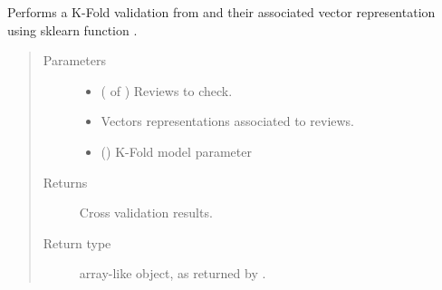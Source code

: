 \documentclass[letterpaper,10pt,english]{sphinxmanual}
\begin{document}
\begin{fulllineitems}
\label{\detokenize{learning:loacore.learning.validation.k_fold_validation}}
Performs a K-Fold validation from  and their associated vector representation using sklearn function
.
\begin{quote}\begin{description}
\item[{Parameters}] \leavevmode\begin{itemize}
\item {} 
 ( of {\hyperref[\detokenize{classes:loacore.classes.classes.Review}]{}}) \textendash{} Reviews to check.

\item {} 
 \textendash{} Vectors representations associated to reviews.

\item {} 
 () \textendash{} K-Fold model parameter

\end{itemize}

\item[{Returns}] \leavevmode
Cross validation results.

\item[{Return type}] \leavevmode

array-like object, as returned by .


\end{description}\end{quote}

\end{fulllineitems}

\end{document}
